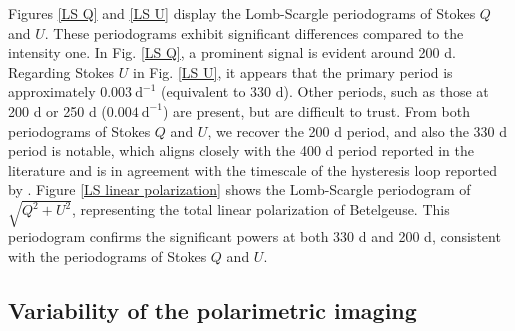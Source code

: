 \documentclass{aa}
\begin{document}
Figures \ref{LS Q} and \ref{LS U} display the Lomb-Scargle periodograms of Stokes $Q$ and $U$. These periodograms exhibit significant differences compared to the intensity one. In Fig. \ref{LS Q}, a prominent signal is evident around 200 d. Regarding Stokes $U$ in Fig. \ref{LS U}, it appears that the primary period is approximately $0.003 \ \mathrm{d^{-1}}$ (equivalent to 330 d). Other periods, such as those at 200 d or 250 d ($0.004 \ \mathrm{d^{-1}}$) are present, but are difficult to trust. From both periodograms of Stokes $Q$ and $U$, we recover the 200 d period, and also the 330 d period is notable, which aligns closely with the 400 d period reported in the literature and is in agreement with the timescale of the hysteresis loop reported by \cite{kravchenko_tomography_2019}.  
Figure \ref{LS linear polarization} shows the Lomb-Scargle periodogram of $\sqrt{Q^2+U^2}$, representing the total linear polarization of Betelgeuse. 
This periodogram confirms the significant powers at both 330 d and 200 d, consistent with the periodograms of Stokes $Q$ and $U$. 



\subsection{Variability of the polarimetric imaging}
\end{document}
